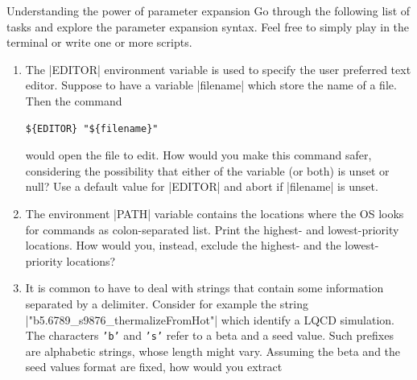 
\begin{exercise}[Inspirational]{Understanding the power of parameter expansion}
    Go through the following list of tasks and explore the parameter expansion syntax.
    Feel free to simply play in the terminal or write one or more scripts.
    \begin{enumerate}[itemsep=0mm]
        \item The \bash|EDITOR| environment variable is used to specify the user preferred text editor.
              Suppose to have a variable \bash|filename| which store the name of a file.
              Then the command
              \begin{lstlisting}[style=MyBash]
                  ${EDITOR} "${filename}"
              \end{lstlisting}
              would open the file to edit.
              How would you make this command safer, considering the possibility that either of the variable (or both) is unset or null?
              Use a default value for \bash|EDITOR| and abort if \bash|filename| is unset.
        \item The environment \bash|PATH| variable contains the locations where the OS looks for commands as colon-separated list.
              Print the highest- and lowest-priority locations.
              How would you, instead, exclude the highest- and the lowest-priority locations?
        \item It is common to have to deal with strings that contain some information separated by a delimiter.
              Consider for example the string \bash|"b5.6789_s9876_thermalizeFromHot"| which identify a LQCD simulation.
              The characters \texttt{'b'} and \texttt{'s'} refer to a beta and a seed value.
              Such prefixes are alphabetic strings, whose length might vary.
              Assuming the beta and the seed values format are fixed, how would you extract

\end{enumerate}
\end{exercise}
